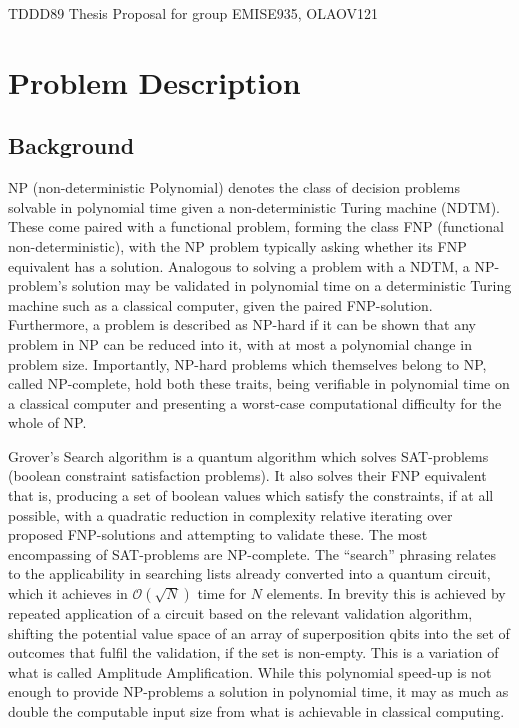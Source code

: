 \documentclass[msc,lith,english]{liuthesis}
\author{\parbox{\textwidth}{Emil Segerbäck\\ Olav Övrebö}}
\begin{document}
TDDD89 Thesis Proposal for group EMISE935, OLAOV121

\section{Problem Description}
\subsection{Background}
NP (non-deterministic Polynomial) denotes the class of decision problems solvable in polynomial time given a non-deterministic Turing machine (NDTM). These come paired with a functional problem, forming the class FNP (functional non-deterministic), with the NP problem typically asking whether its FNP equivalent has a solution. Analogous to solving a problem with a NDTM, a NP-problem's solution may be validated in polynomial time on a deterministic Turing machine such as a classical computer, given the paired FNP-solution. Furthermore, a problem is described as NP-hard if it can be shown that any problem in NP can be reduced into it, with at most a polynomial change in problem size. Importantly, NP-hard problems which themselves belong to NP, called NP-complete, hold both these traits, being verifiable in polynomial time on a classical computer and presenting a worst-case computational difficulty for the whole of NP. \cite{CCAMA}

Grover’s Search algorithm is a quantum algorithm which solves SAT-problems (boolean constraint satisfaction problems). It also solves their FNP equivalent that is, producing a set of boolean values which satisfy the constraints, if at all possible, with a quadratic reduction in complexity relative iterating over proposed FNP-solutions and attempting to validate these.\cite{QCQI}\cite{CCAMA} The most encompassing of SAT-problems are NP-complete. The “search” phrasing relates to the applicability in searching lists already converted into a quantum circuit, which it achieves in $\mathcal{O}(\sqrt{N})$ time for $N$ elements. In brevity this is achieved by repeated application of a circuit based on the relevant validation algorithm, shifting the potential value space of an array of superposition qbits into the set of outcomes that fulfil the validation, if the set is non-empty. This is a variation of what is called Amplitude Amplification. While this polynomial speed-up is not enough to provide NP-problems a solution in polynomial time, it may as much as double the computable input size from what is achievable in classical computing.\cite{EIQC}
\end{document}
